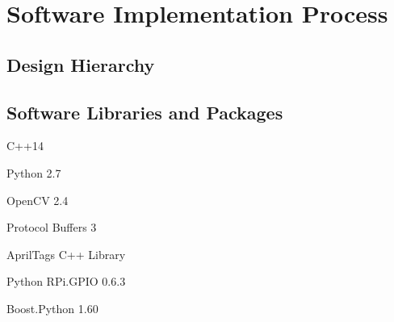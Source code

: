 
\section{Software Implementation Process}
\label{sec:software_implementation}

\subsection{Design Hierarchy}
\label{sec:software_design}

\subsection{Software Libraries and Packages}
\label{sec:software_libraries}
\item C++14
\item Python 2.7 \cite{python27}
\item OpenCV 2.4 \cite{opencv24}
\item Protocol Buffers 3 \cite{protobuf3}
\item AprilTags C++ Library \cite{apriltags}
\item Python RPi.GPIO 0.6.3 \cite{python_rpigpio}
\item Boost.Python 1.60 \cite{python_boost}










